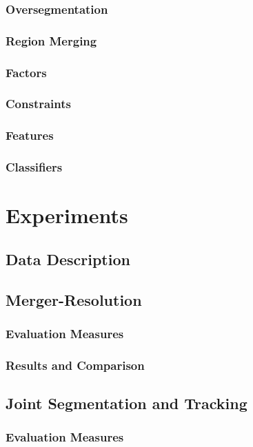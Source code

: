 \documentclass[11pt]{article}
\begin{document}
\subsubsection{Oversegmentation}
\label{sec-6-2-2}
\subsubsection{Region Merging}
\label{sec-6-2-3}
\subsubsection{Factors}
\label{sec-6-2-4}
\subsubsection{Constraints}
\label{sec-6-2-5}
\subsubsection{Features}
\label{sec-6-2-6}
\subsubsection{Classifiers}
\label{sec-6-2-7}
\section{Experiments}
\label{sec-7}
\subsection{Data Description}
\label{sec-7-1}
\subsection{Merger-Resolution}
\label{sec-7-2}
\subsubsection{Evaluation Measures}
\label{sec-7-2-1}
\subsubsection{Results and Comparison}
\label{sec-7-2-2}
\subsection{Joint Segmentation and Tracking}
\label{sec-7-3}
\subsubsection{Evaluation Measures}
\label{sec-7-3-1}
\end{document}
